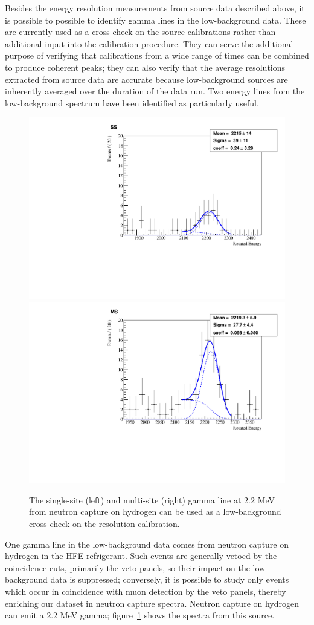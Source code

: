 Besides the energy resolution measurements from source data described above, it is possible to possible to identify gamma lines in the low-background data.  These are currently used as a cross-check on the source calibrations rather than additional input into the calibration procedure.  They can serve the additional purpose of verifying that calibrations from a wide range of times can be combined to produce coherent peaks; they can also verify that the average resolutions extracted from source data are accurate because low-background sources are inherently averaged over the duration of the data run.  Two energy lines from the low-background spectrum have been identified as particularly useful.

\begin{figure}
\begin{center}
\includegraphics[keepaspectratio=true,width=.49\textwidth]{neutronHydrogen_ss_denoised.pdf}
\includegraphics[keepaspectratio=true,width=.49\textwidth]{neutronHydrogen_ms_denoised.pdf}
\end{center}
\renewcommand{\baselinestretch}{1}
\small\normalsize
\begin{quote}
\caption{The single-site (left) and multi-site (right) gamma line at $2.2$ MeV from neutron capture on hydrogen can be used as a low-background cross-check on the resolution calibration.~\cite{EnergyDocumentRun2ab}}
\label{fig:neutronHydrogenCheck}
\end{quote}
\end{figure}
\renewcommand{\baselinestretch}{2}
\small\normalsize

One gamma line in the low-background data comes from neutron capture on hydrogen in the HFE refrigerant.  Such events are generally vetoed by the coincidence cuts, primarily the veto panels, so their impact on the low-background data is suppressed; conversely, it is possible to study only events which occur in coincidence with muon detection by the veto panels, thereby enriching our dataset in neutron capture spectra.  Neutron capture on hydrogen can emit a $2.2$ MeV gamma; figure~\ref{fig:neutronHydrogenCheck} shows the spectra from this source.~\cite{NeutronCaptureGammas,EnergyDocumentRun2ab}


